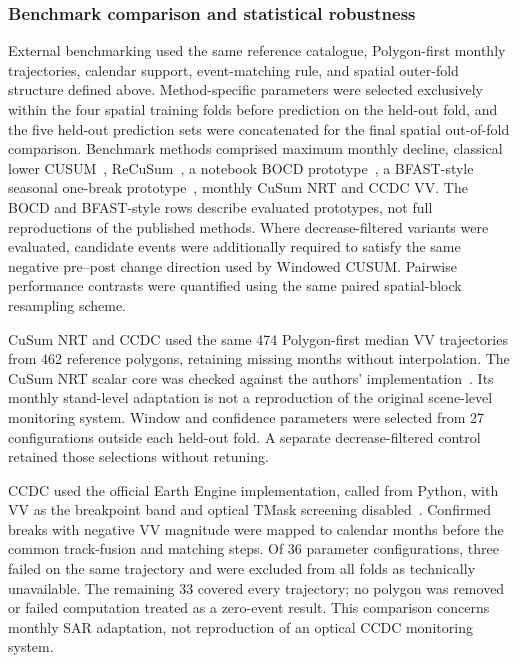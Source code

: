 \subsubsection{Benchmark comparison and statistical robustness}
\label{sec:benchmark_robustness}

External benchmarking used the same reference catalogue, Polygon-first monthly trajectories, calendar support, event-matching rule, and spatial outer-fold structure defined above. Method-specific parameters were selected exclusively within the four spatial training folds before prediction on the held-out fold, and the five held-out prediction sets were concatenated for the final spatial out-of-fold comparison. Benchmark methods comprised maximum monthly decline, classical lower CUSUM~\citep{Page1954CUSUM}, ReCuSum~\citep{Ygorra2023ReCuSum}, a notebook BOCD prototype~\citep{Bottani2026f-pol_BOCD}, a BFAST-style seasonal one-break prototype~\citep{Verbesselt2010BFAST}, monthly CuSum NRT and CCDC VV. The BOCD and BFAST-style rows describe evaluated prototypes, not full reproductions of the published methods. Where decrease-filtered variants were evaluated, candidate events were additionally required to satisfy the same negative pre--post change direction used by Windowed CUSUM. Pairwise performance contrasts were quantified using the same paired spatial-block resampling scheme.

CuSum NRT and CCDC used the same 474 Polygon-first median VV trajectories from 462 reference polygons, retaining missing months without interpolation. The CuSum NRT scalar core was checked against the authors' implementation~\citep{Ygorra2024CuSumNRT}. Its monthly stand-level adaptation is not a reproduction of the original scene-level monitoring system. Window and confidence parameters were selected from 27 configurations outside each held-out fold. A separate decrease-filtered control retained those selections without retuning.

CCDC used the official Earth Engine implementation, called from Python, with VV as the breakpoint band and optical TMask screening disabled~\citep{Bullock2022CCDC_S1}. Confirmed breaks with negative VV magnitude were mapped to calendar months before the common track-fusion and matching steps. Of 36 parameter configurations, three failed on the same trajectory and were excluded from all folds as technically unavailable. The remaining 33 covered every trajectory; no polygon was removed or failed computation treated as a zero-event result. This comparison concerns monthly SAR adaptation, not reproduction of an optical CCDC monitoring system.

